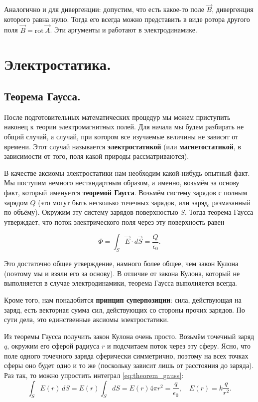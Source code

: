 \documentclass[11pt,a4paper]{article}
\numberwithin{equation}{section}
\newcommand{\rot}{\mathrm{rot}\,}
\newcommand{\eps}{\epsilon}
\begin{document}
Аналогично и для дивергенции: допустим, что есть какое-то поле $\vec{B}$,
дивергенция которого равна нулю. Тогда его всегда можно представить в
виде ротора другого поля $\vec{B} =\rot \vec{A}$. Эти аргументы и работают
в электродинамике. 

\section{Электростатика.}
\label{sec:statics}

\subsection{Теорема Гаусса.}
\label{sec:coulomb}

После подготовительных математических процедур мы можем приступить
наконец к теории электромагнитных полей. Для начала мы будем разбирать
не общий случай, а случай, при котором все изучаемые величины не
зависят от времени. Этот случай называется \textbf{электростатикой} (или
\textbf{магнетостатикой}, в зависимости от того, поля какой природы
рассматриваются). 

В качестве аксиомы электростатики нам необходим какой-нибудь опытный
факт. Мы поступим немного нестандартным образом, а именно, возьмём за
основу факт, который именуется \textbf{теоремой Гаусса}. Возьмём
систему зарядов с полным зарядом $Q$ (это могут быть несколько
точечных зарядов, или заряд, размазанный по объёму). Окружим эту
систему зарядов поверхностью $S$. Тогда теорема Гаусса утверждает, что
поток электрического поля через эту поверхность равен

\begin{equation}
  \label{eq:theorem_gauss}
  \Phi = \int_S \vec{E} \cdot d\vec{S} = \frac{Q}{\epsilon_0}.
\end{equation}

Это достаточно общее утверждение, намного более общее, чем закон
Кулона (поэтому мы и взяли его за основу). В отличие от закона Кулона,
который не выполняется в случае электродинамики, теорема Гаусса
выполняется всегда. 

Кроме того, нам понадобится \textbf{принцип суперпозиции}: сила,
действующая на заряд, есть векторная сумма сил, действующих со стороны
прочих зарядов. По сути дела, это единственные аксиомы электростатики.

Из теоремы Гаусса получить закон Кулона очень просто. Возьмём точечный
заряд $q$, окружим его сферой радиуса $r$ и подсчитаем поток через эту
сферу. Ясно, что поле одного точечного заряда сферически симметрично,
поэтому на всех точках сферы оно будет одно и то же (поскольку зависит
лишь от расстояния до заряда). Раз так, то можно упростить интеграл
\eqref{eq:theorem_gauss}: 
\begin{equation}
  \label{eq:law_coulomb}
  \int_S E(r)\, dS = E(r) \int_S dS = E(r) 4\pi r^2 =
  \frac{q}{\eps_0}, \quad E(r) = k\frac{q}{r^2}.
\end{equation}
\end{document}

